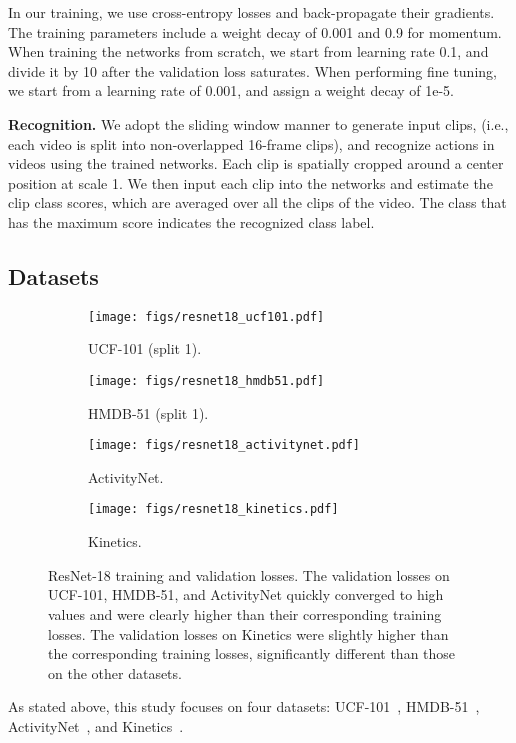 \documentclass[10pt,twocolumn,letterpaper]{article}
\begin{document}
      In our training, we use cross-entropy losses and back-propagate their gradients.
      The training parameters include a weight decay of 0.001 and 0.9 for momentum.
      When training the networks from scratch, we start from learning rate 0.1,
      and divide it by 10 after the validation loss saturates.
      When performing fine tuning, we start from a learning rate of 0.001, and assign a weight decay of 1e-5.

    \vspace{1mm}
    \noindent \textbf{Recognition.}
      We adopt the sliding window manner to generate input clips,
      (i.e., each video is split into non-overlapped 16-frame clips),
      and recognize actions in videos using the trained networks.
      Each clip is spatially cropped around a center position at scale 1.
      We then input each clip into the networks and
      estimate the clip class scores, which are averaged over all the clips of the video.
      The class that has the maximum score indicates the recognized class label.

  \subsection{Datasets}
    \begin{figure*}[t]
      \begin{subfigure}[b]{0.2475\linewidth}
        \texttt{[image: figs/resnet18\_ucf101.pdf]}
        \caption{UCF-101 (split 1).}\label{fig:resnet18_ucf101}
      \end{subfigure}
      \begin{subfigure}[b]{0.2475\linewidth}
        \texttt{[image: figs/resnet18\_hmdb51.pdf]}
        \caption{HMDB-51 (split 1).}\label{fig:resnet18_hmdb51}
      \end{subfigure}
      \begin{subfigure}[b]{0.2475\linewidth}
        \texttt{[image: figs/resnet18\_activitynet.pdf]}
        \caption{ActivityNet.}\label{fig:resnet18_activitynet}
      \end{subfigure}
      \begin{subfigure}[b]{0.2475\linewidth}
        \texttt{[image: figs/resnet18\_kinetics.pdf]}
        \caption{Kinetics.}\label{fig:resnet18_kinetics}
      \end{subfigure}
      \caption{
        ResNet-18 training and validation losses.
        The validation losses on UCF-101, HMDB-51, and ActivityNet quickly converged to high values
        and were clearly higher than their corresponding training losses.
        The validation losses on Kinetics were slightly higher than the corresponding training losses,
        significantly different than those on the other datasets.
      }\label{fig:resnet18}
    \end{figure*}
    As stated above, this study focuses on four datasets:
    UCF-101~\cite{UCF101}, HMDB-51~\cite{HMDB51}, ActivityNet~\cite{activitynet}, and Kinetics~\cite{Kinetics}.
\end{document}
